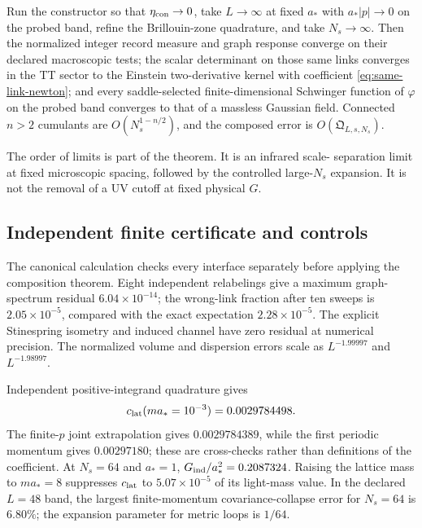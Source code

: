 \begin{theorem}
\label{thm:same-link-quantum-limit}
Run the constructor so that \(\eta_{\rm con}\to0\), take \(L\to\infty\) at
fixed \(a_*\) with \(a_*|p|\to0\) on the probed band, refine the
Brillouin-zone quadrature, and take \(N_s\to\infty\).  Then the normalized
integer record measure and graph response converge on their declared
macroscopic tests; the scalar determinant on those same links converges in
the TT sector to the Einstein two-derivative kernel with coefficient
\eqref{eq:same-link-newton}; and every saddle-selected finite-dimensional
Schwinger function of \(\varphi\) on the probed band converges to that of a
massless Gaussian field.  Connected \(n>2\) cumulants are
\(O(N_s^{1-n/2})\), and the composed error is
\(O({\mathfrak Q}_{L,s,N_s})\).
\end{theorem}

The order of limits is part of the theorem.  It is an infrared scale-
separation limit at fixed microscopic spacing, followed by the controlled
large-\(N_s\) expansion.  It is not the removal of a UV cutoff at fixed
physical \(G\).

\subsection{Independent finite certificate and controls}

The canonical calculation checks every interface separately before applying
the composition theorem.  Eight independent relabelings give a maximum
graph-spectrum residual \(6.04\times10^{-14}\); the wrong-link fraction after
ten sweeps is \(2.05\times10^{-5}\), compared with the exact expectation
\(2.28\times10^{-5}\).  The explicit Stinespring isometry and induced channel
have zero residual at numerical precision.  The normalized volume and
dispersion errors scale as \(L^{-1.99997}\) and \(L^{-1.98997}\).

Independent positive-integrand quadrature gives
\begin{equation}
 c_{\rm lat}(ma_*=10^{-3})=0.0029784498 .
 \label{eq:same-link-numerical-c}
\end{equation}
The finite-\(p\) joint extrapolation gives \(0.0029784389\), while the first
periodic momentum gives \(0.00297180\); these are cross-checks rather than
definitions of the coefficient.  At \(N_s=64\) and \(a_*=1\),
\(G_{\rm ind}/a_*^2=0.2087324\).  Raising the lattice mass to \(ma_*=8\) suppresses
\(c_{\rm lat}\) to \(5.07\times10^{-5}\) of its light-mass value.  In the
declared \(L=48\) band, the largest finite-momentum covariance-collapse
error for \(N_s=64\) is \(6.80\%\); the expansion parameter for metric loops
is \(1/64\).

